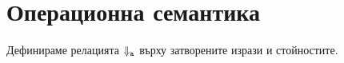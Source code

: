 \section{Операционна семантика}

Дефинираме релацията $\Downarrow_{\vv{a}}$ върху затворените изрази и стойностите.

\begin{prooftree}
\end{prooftree}

\begin{prooftree}
\end{prooftree}

\begin{prooftree}
\end{prooftree}


\begin{prooftree}
\end{prooftree}

\begin{prooftree}
\end{prooftree}

\begin{prooftree}
\end{prooftree}

\begin{prooftree}
\end{prooftree}


